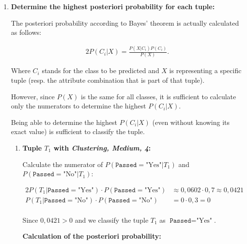 \documentclass[
english,
smallborders
]{i6prcsht}
\newcommand{\BayesNumerator}[3]{P(#1 | \texttt{#2}=\text{"#3"}) \cdot P(\texttt{#2}=\text{"#3"})}
\newcommand{\PosterioriProbability}[3]{P(\texttt{#2}=\text{"#3"} | #1)}
\newcommand{\ResultClass}[2]{\texttt{#1}=\text{"#2"}}
\begin{document}
\begin{solution}
\begin{enumerate}
		\item \textbf{Determine the highest posteriori probability for each tuple:}
		      
		      The posteriori probability according to Bayes' theorem is actually calculated as follows:
		      
		      \begin{alignat*}{2}
			      P(C_i|X) = \frac{P(X|C_i)P(C_i)}{P(X)}.
		      \end{alignat*}
		      
		      Where $C_i$ stands for the class to be predicted and $X$ is representing a specific tuple (resp. the attribute combination that is part of that tuple).
		      
		      However, since $P(X)$ is the same for all classes, it is sufficient to calculate only the numerators to determine the highest $P(C_i|X)$.
		      
		      Being able to determine the highest $P(C_i|X)$ (even without knowing its exact value) is sufficient to classify the tuple.
		      
		      \begin{enumerate}
			      \item \textbf{Tuple $T_1$ with \textit{Clustering, Medium, 4}:}
			            
			            Calculate the numerator of $\PosterioriProbability{T_1}{Passed}{Yes}$ and $\PosterioriProbability{T_1}{Passed}{No}$:
			            
			            \begin{alignat*}{2}
				            \BayesNumerator{T_1}{Passed}{Yes} & \approx 0,0602 \cdot 0,7 \approx 0,0421 \\
				            \BayesNumerator{T_1}{Passed}{No}  & = 0 \cdot 0,3 = 0                       \\
			            \end{alignat*}
			            
			            Since $0,0421 > 0$ and we classify the tuple $T_1$ as $\ResultClass{Passed}{Yes}$.
			            
			            \vspace*{3em}
			            
			            \begin{mdframed}[linecolor=solutioncolor]
				            \color{solutioncolor}
				            \begin{em}
					            \textbf{Calculation of the posteriori probability:}
					            

\end{em}
\end{mdframed}
\end{enumerate}
\end{enumerate}
\end{solution}
\end{document}
